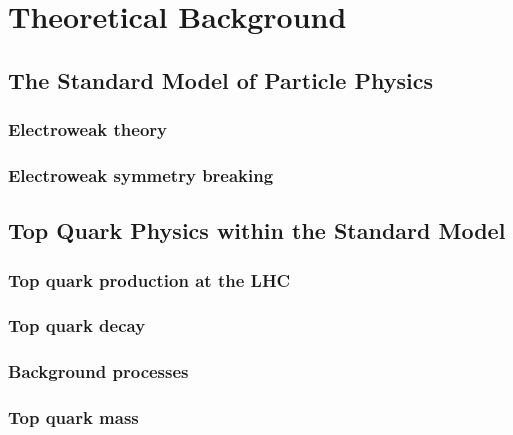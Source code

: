 
\chapter{Theoretical Background}
\label{c:theory}

\ifpdf
    \graphicspath{{02_Theory/plots/}}
\else
    \graphicspath{{02_Theory/plots/EPS/}{02_Theory/plots/}}
\fi

\section{The Standard Model of Particle Physics}
\label{s:SM}

\subsection{Electroweak theory}
\label{ss:electroweak_theory}

\subsection{Electroweak symmetry breaking}
\label{ss:electroweak_symmetry_breaking}

\section{Top Quark Physics within the Standard Model}
\label{s:top_quak_physics}

\subsection{Top quark production at the LHC}
\label{ss:top_production}

\subsection{Top quark decay}
\label{ss:top_decay}

\subsection{Background processes}
\label{ss:backgrounds}

\subsection{Top quark mass}
\label{ss:top_mass}

